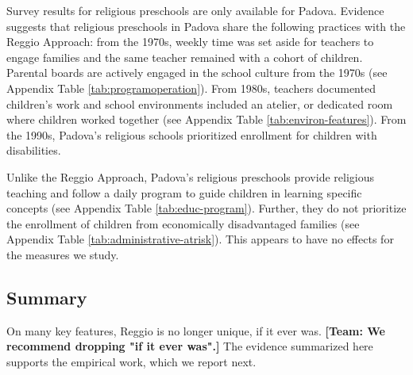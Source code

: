 Survey results for religious preschools are only available for Padova. Evidence suggests that religious preschools in Padova share the following practices with the Reggio Approach: from the 1970s, weekly time was set aside for teachers to engage families and the same teacher remained with a cohort of children. Parental boards are actively engaged in the school culture from the 1970s (see Appendix Table \ref{tab:programoperation}). From 1980s, teachers documented children's work and school environments included an atelier, or dedicated room where children worked together (see Appendix Table \ref{tab:environ-features}). From the 1990s, Padova's religious schools prioritized enrollment for children with disabilities. 

Unlike the Reggio Approach, Padova's religious preschools provide religious teaching and follow a daily program to guide children in learning specific concepts (see Appendix Table \ref{tab:educ-program}). Further, they do not prioritize the enrollment of children from economically disadvantaged families (see Appendix Table \ref{tab:administrative-atrisk}). This appears to have no effects for the measures we study.

\subsection{Summary}

On many key features, Reggio is no longer unique, if it ever was. \textbf{[Team: We recommend dropping "if it ever was".]} The evidence summarized here supports the empirical work, which we report next.

